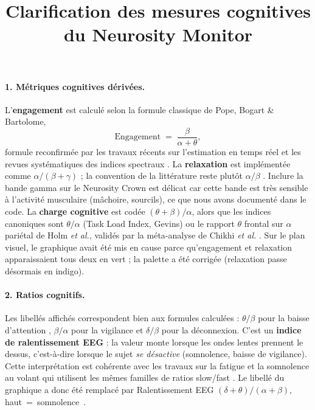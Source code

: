 \documentclass[11pt,a4paper]{article}
\title{\vspace{-1.5cm}Clarification des mesures cognitives du Neurosity Monitor}
\author{}
\date{}
\begin{document}
\maketitle
\vspace{-1.2cm}


\paragraph{1. Métriques cognitives dérivées.}
L'\textbf{engagement} est calculé selon la formule classique de Pope, Bogart \& Bartolome,
\[
\mathrm{Engagement} \;=\; \frac{\beta}{\alpha + \theta},
\]
formule reconfirmée par les travaux récents sur l'estimation en temps réel et les revues systématiques des indices spectraux \cite{Coelli2015,Cattan2023,Apicella2024}. La \textbf{relaxation} est implémentée comme $\alpha/(\beta+\gamma)$ ; la convention de la littérature reste plutôt $\alpha/\beta$ \cite{Putman2023,Brandmeyer2024}. Inclure la bande gamma sur le Neurosity Crown est délicat car cette bande est très sensible à l'activité musculaire (mâchoire, sourcils), ce que nous avons documenté dans le code. La \textbf{charge cognitive} est codée $(\theta+\beta)/\alpha$, alors que les indices canoniques sont $\theta/\alpha$ (Task Load Index, Gevins) ou le rapport $\theta$ frontal sur $\alpha$ pariétal de Holm \emph{et al.}, validés par la méta-analyse de Chikhi \emph{et al.} \cite{Chikhi2022,RaufiLongo2022}. Sur le plan visuel, le graphique avait été mis en cause parce qu'engagement et relaxation apparaissaient tous deux en vert ; la palette a été corrigée (relaxation passe désormais en indigo).

\paragraph{2. Ratios cognitifs.}
Les libellés affichés correspondent bien aux formules calculées : $\theta/\beta$ pour la baisse d'attention \cite{vanSon2019}, $\beta/\alpha$ pour la vigilance et $\delta/\beta$ pour la déconnexion. C'est un \textbf{indice de ralentissement EEG} : la valeur monte lorsque les ondes lentes prennent le dessus, c'est-à-dire lorsque le sujet \emph{se désactive} (somnolence, baisse de vigilance). Cette interprétation est cohérente avec les travaux sur la fatigue et la somnolence au volant qui utilisent les mêmes familles de ratios slow/fast \cite{DiFlumeri2022,Yusoff2023,Arico2023}. Le libellé du graphique a donc été remplacé par \og Ralentissement EEG $(\delta+\theta)/(\alpha+\beta)$, haut~=~somnolence~\fg{}.
\end{document}
